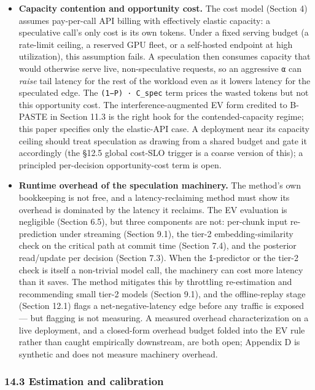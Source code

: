 \documentclass[
  11pt,
]{article}
\providecommand{\tightlist}{%
  \setlength{\itemsep}{0pt}\setlength{\parskip}{0pt}}
\begin{document}
\begin{itemize}
\tightlist
\item
  \textbf{Capacity contention and opportunity cost.} The cost model
  (Section 4) assumes pay-per-call API billing with effectively elastic
  capacity: a speculative call's only cost is its own tokens. Under a
  fixed serving budget (a rate-limit ceiling, a reserved GPU fleet, or a
  self-hosted endpoint at high utilization), this assumption fails. A
  speculation then consumes capacity that would otherwise serve live,
  non-speculative requests, so an aggressive \texttt{α} can \emph{raise}
  tail latency for the rest of the workload even as it lowers latency
  for the speculated edge. The \texttt{(1−P)\ ·\ C\_spec} term prices
  the wasted tokens but not this opportunity cost. The
  interference-augmented EV form credited to B-PASTE in Section 11.3 is
  the right hook for the contended-capacity regime; this paper specifies
  only the elastic-API case. A deployment near its capacity ceiling
  should treat speculation as drawing from a shared budget and gate it
  accordingly (the §12.5 global cost-SLO trigger is a coarse version of
  this); a principled per-decision opportunity-cost term is open.
\item
  \textbf{Runtime overhead of the speculation machinery.} The method's
  own bookkeeping is not free, and a latency-reclaiming method must show
  its overhead is dominated by the latency it reclaims. The EV
  evaluation is negligible (Section 6.5), but three components are not:
  per-chunk input re-prediction under streaming (Section 9.1), the
  tier-2 embedding-similarity check on the critical path at commit time
  (Section 7.4), and the posterior read/update per decision (Section
  7.3). When the \texttt{î}-predictor or the tier-2 check is itself a
  non-trivial model call, the machinery can cost more latency than it
  saves. The method mitigates this by throttling re-estimation and
  recommending small tier-2 models (Section 9.1), and the offline-replay
  stage (Section 12.1) flags a net-negative-latency edge before any
  traffic is exposed --- but flagging is not measuring. A measured
  overhead characterization on a live deployment, and a closed-form
  overhead budget folded into the EV rule rather than caught empirically
  downstream, are both open; Appendix D is synthetic and does not
  measure machinery overhead.
\end{itemize}

\subsubsection{14.3 Estimation and
calibration}\label{estimation-and-calibration}
\end{document}

